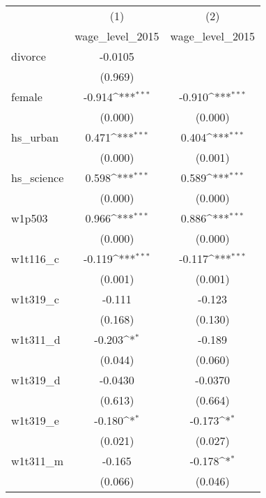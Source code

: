 {
\def\sym#1{\ifmmode^{#1}\else\(^{#1}\)\fi}
\begin{tabular}{l*{2}{c}}
\hline\hline
            &\multicolumn{1}{c}{(1)}&\multicolumn{1}{c}{(2)}\\
            &\multicolumn{1}{c}{wage\_level\_2015}&\multicolumn{1}{c}{wage\_level\_2015}\\
\hline
divorce     &     -0.0105         &                     \\
            &     (0.969)         &                     \\
[1em]
female      &      -0.914\sym{***}&      -0.910\sym{***}\\
            &     (0.000)         &     (0.000)         \\
[1em]
hs\_urban    &       0.471\sym{***}&       0.404\sym{***}\\
            &     (0.000)         &     (0.001)         \\
[1em]
hs\_science  &       0.598\sym{***}&       0.589\sym{***}\\
            &     (0.000)         &     (0.000)         \\
[1em]
w1p503      &       0.966\sym{***}&       0.886\sym{***}\\
            &     (0.000)         &     (0.000)         \\
[1em]
w1t116\_c    &      -0.119\sym{***}&      -0.117\sym{***}\\
            &     (0.001)         &     (0.001)         \\
[1em]
w1t319\_c    &      -0.111         &      -0.123         \\
            &     (0.168)         &     (0.130)         \\
[1em]
w1t311\_d    &      -0.203\sym{*}  &      -0.189         \\
            &     (0.044)         &     (0.060)         \\
[1em]
w1t319\_d    &     -0.0430         &     -0.0370         \\
            &     (0.613)         &     (0.664)         \\
[1em]
w1t319\_e    &      -0.180\sym{*}  &      -0.173\sym{*}  \\
            &     (0.021)         &     (0.027)         \\
[1em]
w1t311\_m    &      -0.165         &      -0.178\sym{*}  \\
            &     (0.066)         &     (0.046)         \\

\end{tabular}}
